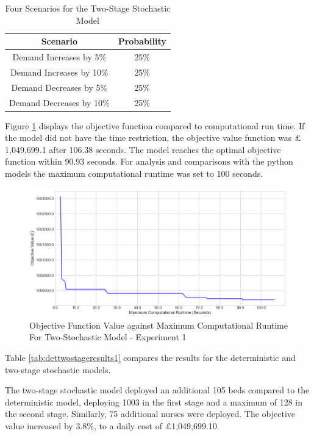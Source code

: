 \documentclass[../thesis.tex]{subfiles}
\begin{document}
\begin{table}[h!]
    \centering
    \begin{tabular}{@{}cc@{}}\toprule
       \textbf{Scenario}  &\textbf{Probability}  \\\midrule
       Demand Increases by 5\% & 25\% \\ 
       Demand Increases by 10\% & 25\% \\
       Demand Decreases by 5\% & 25\% \\ 
       Demand Decreases by 10\% & 25\% \\\bottomrule
    \end{tabular}
    \caption{Four Scenarios for the Two-Stage Stochastic Model}
    \label{tab:scenarios1}
\end{table}

Figure \ref{fig:graphstoch1} displays the objective function compared to computational run time. If the model did not have the time restriction, the objective value function was $\pounds$1,049,699.1 after 106.38 seconds. The model reaches the optimal objective function within 90.93 seconds. For analysis and comparisons with the python models the maximum computational runtime was set to 100 seconds.

\begin{figure}[h!]
    \centering
    \includegraphics[width=12cm]{Chapters/Chapter5/Figures/StochasticRunTime.png}
    \caption{Objective Function Value against Maximum Computational Runtime For Two-Stochastic Model - Experiment 1}
    \label{fig:graphstoch1}
\end{figure}


Table \ref{tab:dettwostageresults1} compares the results for the deterministic and two-stage stochastic models. 

The two-stage stochastic model deployed an additional 105 beds compared to the deterministic model, deploying 1003 in the first stage and a maximum of 128 in the second stage. Similarly, 75 additional nurses were deployed. The objective value increased by 3.8\%, to a daily cost of $\pounds$1,049,699.10.
\end{document}
